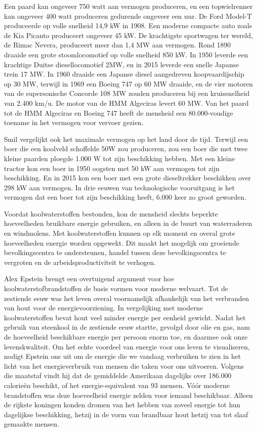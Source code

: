 Een paard kan ongeveer 750 watt aan vermogen produceren, en een topwielrenner kan ongeveer 400 watt produceren gedurende ongeveer een uur. De Ford Model-T produceerde op volle snelheid 14,9 kW in 1908. Een moderne compacte auto zoals de Kia Picanto produceert ongeveer 45 kW. De krachtigste sportwagen ter wereld, de Rimac Nevera, produceert meer dan 1,4 MW aan vermogen. Rond 1890 draaide een grote stoomlocomotief op volle snelheid 850 kW. In 1950 leverde een krachtige Duitse diesellocomotief 2MW, en in 2015 leverde een snelle Japanse trein 17 MW. In 1960 draaide een Japanse diesel aangedreven koopvaardijschip op 30 MW, terwijl in 1969 een Boeing 747 op 60 MW draaide, en de vier motoren van de supersonische Concorde 108 MW zouden produceren bij een kruissnelheid van 2.400 km/u. De motor van de HMM Algeciras levert 60 MW. Van het paard tot de HMM Algeciras en Boeing 747 heeft de mensheid een 80.000-voudige toename in het vermogen voor vervoer gezien.

Smil vergelijkt ook het maximale vermogen op het land door de tijd. Terwijl een boer die een koolveld schoffelde 50W zou produceren, zou een boer die met twee kleine paarden ploegde 1.000 W tot zijn beschikking hebben. Met een kleine tractor kon een boer in 1950 oogsten met 50 kW aan vermogen tot zijn beschikking. En in 2015 kon een boer met een grote dieseltrekker beschikken over 298 kW aan vermogen. In drie eeuwen van technologische vooruitgang is het vermogen dat een boer tot zijn beschikking heeft, 6.000 keer zo groot geworden.

Voordat koolwaterstoffen bestonden, kon de mensheid slechts beperkte hoeveelheden bruikbare energie gebruiken, en alleen in de buurt van waterraderen en windmolens. Met koolwaterstoffen kunnen op elk moment en overal grote hoeveelheden energie worden opgewekt. Dit maakt het mogelijk om groeiende bevolkingscentra te ondersteunen, handel tussen deze bevolkingscentra te vergroten en de arbeidsproductiviteit te verhogen.

Alex Epstein brengt een overtuigend argument voor hoe koolwaterstofbrandstoffen de basis vormen voor moderne welvaart.\autocite{97} Tot de zestiende eeuw was het leven overal voornamelijk afhankelijk van het verbranden van hout voor de energievoorziening. In vergelijking met moderne koolwaterstoffen bevat hout veel minder energie per eenheid gewicht. Nadat het gebruik van steenkool in de zestiende eeuw startte, gevolgd door olie en gas, nam de hoeveelheid beschikbare energie per persoon enorm toe, en daarmee ook onze levenskwaliteit. Om het echte voordeel van energie voor ons leven te visualiseren, nodigt Epstein ons uit om de energie die we vandaag verbruiken te zien in het licht van het energieverbruik van mensen die taken voor ons uitvoeren. Volgens die maatstaf vindt hij dat de gemiddelde Amerikaan dagelijks over 186.000 calorieën beschikt, of het energie-equivalent van 93 mensen. Vóór moderne brandstoffen was deze hoeveelheid energie zelden voor iemand beschikbaar. Alleen de rijkste koningen konden dromen van het hebben van zoveel energie tot hun dagelijkse beschikking, hetzij in de vorm van brandbaar hout hetzij van tot slaaf gemaakte mensen.

